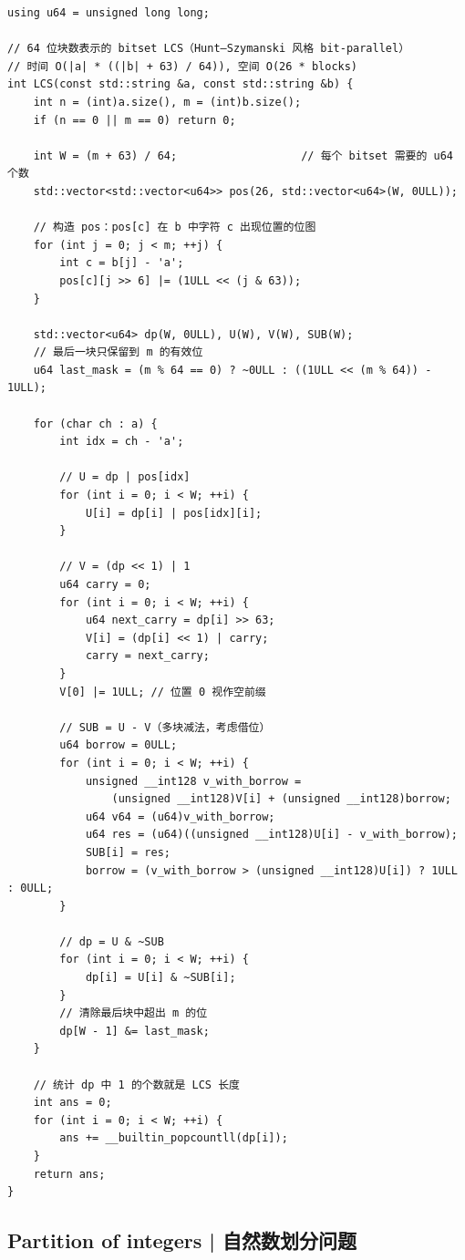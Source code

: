         \begin{lstlisting}
using u64 = unsigned long long;

// 64 位块数表示的 bitset LCS（Hunt–Szymanski 风格 bit-parallel）
// 时间 O(|a| * ((|b| + 63) / 64)), 空间 O(26 * blocks)
int LCS(const std::string &a, const std::string &b) {
    int n = (int)a.size(), m = (int)b.size();
    if (n == 0 || m == 0) return 0;

    int W = (m + 63) / 64;                   // 每个 bitset 需要的 u64 个数
    std::vector<std::vector<u64>> pos(26, std::vector<u64>(W, 0ULL));

    // 构造 pos：pos[c] 在 b 中字符 c 出现位置的位图
    for (int j = 0; j < m; ++j) {
        int c = b[j] - 'a';
        pos[c][j >> 6] |= (1ULL << (j & 63));
    }

    std::vector<u64> dp(W, 0ULL), U(W), V(W), SUB(W);
    // 最后一块只保留到 m 的有效位
    u64 last_mask = (m % 64 == 0) ? ~0ULL : ((1ULL << (m % 64)) - 1ULL);

    for (char ch : a) {
        int idx = ch - 'a';

        // U = dp | pos[idx]
        for (int i = 0; i < W; ++i) {
            U[i] = dp[i] | pos[idx][i];
        }

        // V = (dp << 1) | 1
        u64 carry = 0;
        for (int i = 0; i < W; ++i) {
            u64 next_carry = dp[i] >> 63;
            V[i] = (dp[i] << 1) | carry;
            carry = next_carry;
        }
        V[0] |= 1ULL; // 位置 0 视作空前缀

        // SUB = U - V（多块减法，考虑借位）
        u64 borrow = 0ULL;
        for (int i = 0; i < W; ++i) {
            unsigned __int128 v_with_borrow =
                (unsigned __int128)V[i] + (unsigned __int128)borrow;
            u64 v64 = (u64)v_with_borrow;
            u64 res = (u64)((unsigned __int128)U[i] - v_with_borrow);
            SUB[i] = res;
            borrow = (v_with_borrow > (unsigned __int128)U[i]) ? 1ULL : 0ULL;
        }

        // dp = U & ~SUB
        for (int i = 0; i < W; ++i) {
            dp[i] = U[i] & ~SUB[i];
        }
        // 清除最后块中超出 m 的位
        dp[W - 1] &= last_mask;
    }

    // 统计 dp 中 1 的个数就是 LCS 长度
    int ans = 0;
    for (int i = 0; i < W; ++i) {
        ans += __builtin_popcountll(dp[i]);
    }
    return ans;
}
        \end{lstlisting}

\subsection{Partition of integers | 自然数划分问题}

